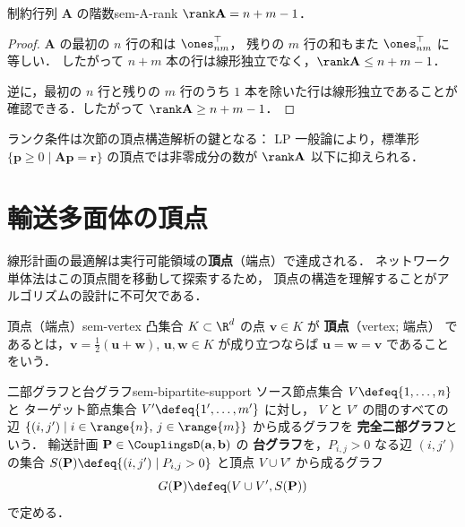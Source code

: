 \begin{claim}{制約行列 $\mathbf{A}$ の階数}{sem-A-rank}
  $\rank \mathbf{A} = n + m - 1$．
\end{claim}

\begin{proof}
  $\mathbf{A}$ の最初の $n$ 行の和は $\ones_{nm}^\top$，
  残りの $m$ 行の和もまた $\ones_{nm}^\top$ に等しい．
  したがって $n + m$ 本の行は線形独立でなく，$\rank \mathbf{A} \leq n + m - 1$．

  逆に，最初の $n$ 行と残りの $m$ 行のうち $1$ 本を除いた行は線形独立であることが
  確認できる．したがって $\rank \mathbf{A} \geq n + m - 1$．
\end{proof}

ランク条件は次節の頂点構造解析の鍵となる：
LP 一般論により，標準形 $\{\mathbf{p} \geq 0 \mid \mathbf{A}\mathbf{p} = \mathbf{r}\}$
の頂点では非零成分の数が $\rank \mathbf{A}$ 以下に抑えられる．

\section{輸送多面体の頂点}
\label{sec:sem-transport-vertices}

線形計画の最適解は実行可能領域の\textbf{頂点}（端点）で達成される．
ネットワーク単体法はこの頂点間を移動して探索するため，
頂点の構造を理解することがアルゴリズムの設計に不可欠である．

\begin{definition}{頂点（端点）}{sem-vertex}
  凸集合 $K \subset \R^d$ の点 $\mathbf{v} \in K$ が \textbf{頂点}（vertex; 端点）
  であるとは，$\mathbf{v} = \tfrac{1}{2}(\mathbf{u} + \mathbf{w})$,
  $\mathbf{u}, \mathbf{w} \in K$ が成り立つならば $\mathbf{u} = \mathbf{w} = \mathbf{v}$
  であることをいう．
\end{definition}

\begin{definition}{二部グラフと台グラフ}{sem-bipartite-support}
  ソース節点集合 $V \defeq \{1, \ldots, n\}$ と
  ターゲット節点集合 $V' \defeq \{1', \ldots, m'\}$ に対し，
  $V$ と $V'$ の間のすべての辺
  $\{(i, j') \mid i \in \range{n},\, j \in \range{m}\}$ から成るグラフを
  \textbf{完全二部グラフ}という．
  輸送計画 $\mathbf{P} \in \CouplingsD(\mathbf{a}, \mathbf{b})$ の
  \textbf{台グラフ}を，$P_{i,j} > 0$ なる辺 $(i, j')$ の集合
  $S(\mathbf{P}) \defeq \{(i, j') \mid P_{i,j} > 0\}$ と頂点 $V \cup V'$ から成るグラフ
  \[
    G(\mathbf{P}) \defeq (V \cup V', S(\mathbf{P}))
  \]
  で定める．
\end{definition}

